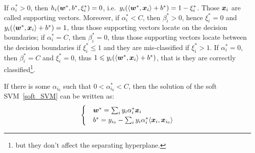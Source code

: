 If $\alpha_i^* > 0$, then $h_i(\boldsymbol{w}^*, b^*, \xi_i^*) = 0$, i.e.\ 
$y_i(\langle\boldsymbol{w}^*, \boldsymbol{x}_i\rangle + b^*) = 1 - \xi^*_i$. Those $\boldsymbol{x}_i$ are called supporting vectors. 
Moreover, if $\alpha^*_i < C$, then $\beta^*_i > 0$, hence $\xi^*_i = 0$ and
$y_i(\langle\boldsymbol{w}^*, \boldsymbol{x}_i\rangle + b^*) = 1$, thus those supporting vectors locate on the decision 
boundaries; if $\alpha^*_i = C$, then $\beta^*_i = 0$, thus those supporting vectors locate between the
decision boundaries if $\xi^*_i \leqslant 1$ and they are mis-classified if $\xi^*_i > 1$. If $\alpha^*_i = 0$,
then $\beta^*_i = C$ and $\xi^*_i = 0$, thus $1 \leqslant y_i(\langle\boldsymbol{w}^*, \boldsymbol{x}_i\rangle + b^*)$, that is 
they are correctly classified\footnote{but they don't affect the separating hyperplane.}.

If there is some $\alpha_{i_0}$ such that 
$0 < \alpha_{i_0}^* < C$, then the solution of the soft SVM~\eqref{soft_SVM} can be written as:
\begin{equation}
    \begin{cases}
        &\boldsymbol{w}^* = \sum_i y_i \alpha^*_i \boldsymbol{x}_i\\
        &b^* = y_{i_0} - \sum_i y_i \alpha^*_i \langle \boldsymbol{x}_i, \boldsymbol{x}_{i_0}\rangle
    \end{cases}
\end{equation}

